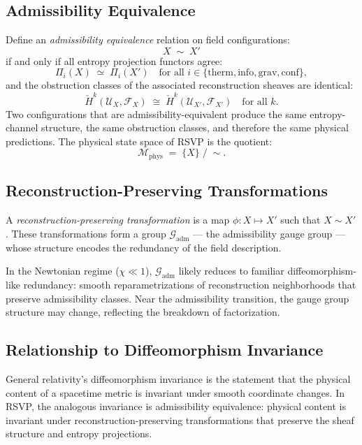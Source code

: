 \documentclass[11pt, a4paper]{article}
\theoremstyle{plain}
\theoremstyle{definition}
\theoremstyle{remark}
\newcommand{\sheaf}{\mathcal{F}}
\newcommand{\Ucover}{\mathcal{U}}
\newcommand{\Hcech}{\check{H}}
\begin{document}
\subsection{Admissibility Equivalence}

Define an \emph{admissibility equivalence} relation on field configurations:
\[
  X \;\sim\; X'
\]
if and only if all entropy projection functors agree:
\[
  \Pi_i(X) \;\simeq\; \Pi_i(X') \quad \text{for all } i \in \{\mathrm{therm},
  \mathrm{info}, \mathrm{grav}, \mathrm{conf}\},
\]
and the obstruction classes of the associated reconstruction sheaves are identical:
\[
  \Hcech^k(\Ucover_X, \sheaf_X) \;\cong\; \Hcech^k(\Ucover_{X'}, \sheaf_{X'})
  \quad \text{for all } k.
\]
Two configurations that are admissibility-equivalent produce the same entropy-channel
structure, the same obstruction classes, and therefore the same physical predictions.
The physical state space of RSVP is the quotient:
\[
  \mathcal{M}_{\mathrm{phys}} \;=\; \{X\} \;/\; {\sim}.
\]

\subsection{Reconstruction-Preserving Transformations}

A \emph{reconstruction-preserving transformation} is a map $\phi: X \mapsto X'$
such that $X \sim X'$. These transformations form a group $\mathcal{G}_{\mathrm{adm}}$
--- the admissibility gauge group --- whose structure encodes the redundancy of the
field description.

In the Newtonian regime ($\chi \ll 1$), $\mathcal{G}_{\mathrm{adm}}$ likely reduces
to familiar diffeomorphism-like redundancy: smooth reparametrizations of
reconstruction neighborhoods that preserve admissibility classes. Near the
admissibility transition, the gauge group structure may change, reflecting the
breakdown of factorization.

\subsection{Relationship to Diffeomorphism Invariance}

General relativity's diffeomorphism invariance is the statement that the physical
content of a spacetime metric is invariant under smooth coordinate changes. In RSVP,
the analogous invariance is admissibility equivalence: physical content is invariant
under reconstruction-preserving transformations that preserve the sheaf structure and
entropy projections.
\end{document}
